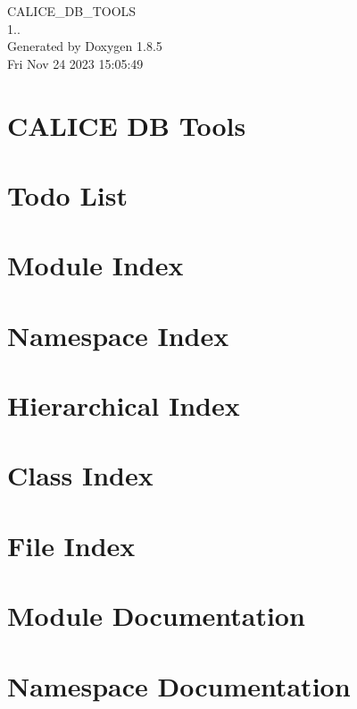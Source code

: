 \documentclass[twoside]{book}
\newcommand{\clearemptydoublepage}{%
  \newpage{\pagestyle{empty}\cleardoublepage}%
}
\begin{document}
\begin{titlepage}
\vspace*{7cm}
\begin{center}%
{\Large C\-A\-L\-I\-C\-E\-\_\-\-D\-B\-\_\-\-T\-O\-O\-L\-S \\[1ex]\large 1.. }\\
\vspace*{1cm}
{\large Generated by Doxygen 1.8.5}\\
\vspace*{0.5cm}
{\small Fri Nov 24 2023 15:05:49}\\
\end{center}
\end{titlepage}
\clearemptydoublepage
\tableofcontents
\clearemptydoublepage
{}

\chapter{C\-A\-L\-I\-C\-E D\-B Tools}
\label{index}
\chapter{Todo List}
\label{todo}

\chapter{Module Index}

\chapter{Namespace Index}

\chapter{Hierarchical Index}

\chapter{Class Index}

\chapter{File Index}

\chapter{Module Documentation}

\chapter{Namespace Documentation}

\end{document}
